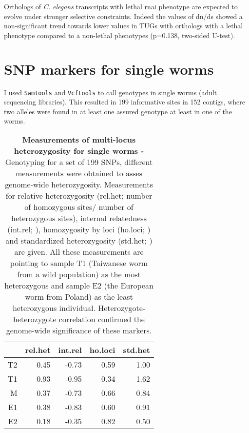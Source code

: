 
Orthologs of \textit{C. elegans} transcripts with lethal rnai
phenotype are expected to evolve under stronger selective
constraints. Indeed the values of dn/ds showed a non-significant trend
towards lower values in TUGs with orthologs with a lethal phenotype
compared to a non-lethal phenotypes (p=0.138, two-sided U-test).

\section{SNP markers for single worms}

I used \texttt{Samtools}\cite{journals/bioinformatics/LiHWFRHMAD09}
and \texttt{Vcftools}\cite{pmid21653522} to call genotypes in single
worms (adult sequencing libraries). This resulted in 199 informative
sites in 152 contigs, where two alleles were found in at least one
assured genotype at least in one of the worms.

\begin{table}[ht]
\begin{center}
\begin{tabular}{rrrrr}
  \hline
 & rel.het & int.rel & ho.loci & std.het \\ 
  \hline
T2 & 0.45 & -0.73 & 0.59 & 1.00 \\ 
  T1 & 0.93 & -0.95 & 0.34 & 1.62 \\ 
  M & 0.37 & -0.73 & 0.66 & 0.84 \\ 
  E1 & 0.38 & -0.83 & 0.60 & 0.91 \\ 
  E2 & 0.18 & -0.35 & 0.82 & 0.50 \\ 
   \hline
\end{tabular}
\caption[Measurements of multi-locus heterozygosity for single
worms]{\textbf{Measurements of multi-locus heterozygosity for single
    worms -} Genotyping for a set of 199 SNPs, different measurements
  were obtained to asses genome-wide heterozygosity.  Measurements for
  relative heterozygosity (rel.het; number of homozygous sites/ number
  of heterozygous sites), internal relatedness (int.rel;
  \cite{pmid11571049}), homozygosity by loci (ho.loci;
  \cite{pmid17107491}) and standardized heterozygosity (std.het;
  \cite{coltman81j}) are given.  All these measurements are pointing
  to sample T1 (Taiwanese worm from a wild population) as the most
  heterozygous and sample E2 (the European worm from Poland) as the
  least heterozygous individual. Heterozygote-heterozygote correlation
  \cite{pmid21565077} confirmed the genome-wide significance of these
  markers.}
\label{snp-sing}
\end{center}
\end{table}

